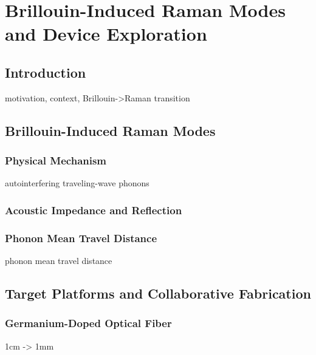 \setcounter{rownumber}{0}
\singlespacing
\chapter{Brillouin-Induced Raman Modes and Device Exploration}
\label{ch:Raman}
\acresetall

\doublespacing


\section{Introduction}
\label{sec:Raman:Introduction}

motivation, context, Brillouin->Raman transition


\section{Brillouin-Induced Raman Modes}
\label{sec:Raman:Brillouin-Induced}

\subsection{Physical Mechanism}
\label{subsec:Raman:PhysicalMechanism}
  autointerfering traveling-wave phonons

\subsection{Acoustic Impedance and Reflection}
\label{subsec:Raman:AcousticImpedanceAndReflection}

\subsection{Phonon Mean Travel Distance}
\label{subsec:Raman:PhononMeanTravelDistance}
phonon mean travel distance


\section{Target Platforms and Collaborative Fabrication}
\label{sec:Raman:TargetPlatforms}

\subsection{Germanium-Doped Optical Fiber}
\label{subsec:Raman:Target:UHNA3}
1cm -> 1mm

